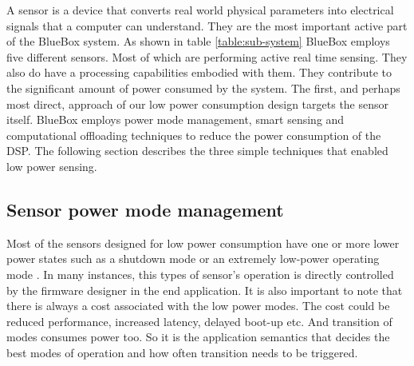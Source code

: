  A sensor is a device that converts real world physical parameters into electrical signals that a computer can understand.  They are the most important active part of the BlueBox system. As shown in table \ref{table:sub-system} BlueBox employs five different sensors. Most of which are performing active real time sensing. They also do have a processing capabilities embodied with them. They contribute to the significant amount of power consumed by the system.  
 The first, and perhaps most direct, approach of our low power consumption design targets the sensor itself. BlueBox employs power mode management, smart sensing and computational offloading techniques to reduce the power consumption of the DSP. The following section describes the three simple techniques that enabled low power sensing.
 \subsection{Sensor power mode management}
   Most of the sensors designed for low power consumption have one or more lower power states such as a shutdown mode or an extremely low-power operating mode \cite{lowpwrsensing}. In many instances, this types of sensor's operation is directly controlled by  the firmware designer in the end application. It is also important to note that there is always a cost associated with the low power modes. The cost could be reduced performance, increased latency, delayed boot-up etc. And transition of modes consumes power too. So it is the application semantics that decides the best modes of operation and how often transition needs to be triggered. 
 
